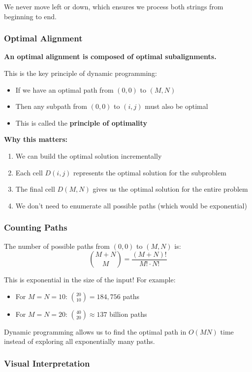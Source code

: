 \documentclass[11pt,a4paper]{article}
\theoremstyle{definition}
\theoremstyle{plain}
\theoremstyle{remark}
\begin{document}
We never move left or down, which ensures we process both strings from beginning to end.

\subsubsection{Optimal Alignment}

\textbf{An optimal alignment is composed of optimal subalignments.}

This is the key principle of dynamic programming:
\begin{itemize}
    \item If we have an optimal path from $(0,0)$ to $(M,N)$
    \item Then any subpath from $(0,0)$ to $(i,j)$ must also be optimal
    \item This is called the \textbf{principle of optimality}
\end{itemize}

\textbf{Why this matters:}
\begin{enumerate}
    \item We can build the optimal solution incrementally
    \item Each cell $D(i,j)$ represents the optimal solution for the subproblem
    \item The final cell $D(M,N)$ gives us the optimal solution for the entire problem
    \item We don't need to enumerate all possible paths (which would be exponential)
\end{enumerate}

\subsubsection{Counting Paths}

The number of possible paths from $(0,0)$ to $(M,N)$ is:
\[
\binom{M+N}{M} = \frac{(M+N)!}{M! \cdot N!}
\]

This is exponential in the size of the input! For example:
\begin{itemize}
    \item For $M=N=10$: $\binom{20}{10} = 184,756$ paths
    \item For $M=N=20$: $\binom{40}{20} \approx 137$ billion paths
\end{itemize}

Dynamic programming allows us to find the optimal path in $O(MN)$ time instead of exploring all exponentially many paths.

\subsubsection{Visual Interpretation}
\end{document}

